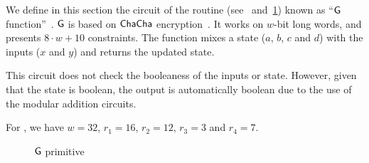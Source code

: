 We define in this section the circuit of the  routine (see~\cite[Section 3.1]{blakecompietf} and~\cref{implementation:alg:g}) known as ``$\mathsf{G}$ function''~\cite[Section 2.4]{aumasson2013blake2}. $\mathsf{G}$ is based on $\mathsf{ChaCha}$ encryption~\cite{bernstein2008chacha}. It works on $w$-bit long words, and presents $8 \cdot w+10$ constraints. The function mixes a state ($a$, $b$, $c$ and $d$) with the inputs ($x$ and $y$) and returns the updated state.

This circuit does not check the booleaness of the inputs or state. However, given that the state is boolean, the output is automatically boolean due to the use of the modular addition circuits.

For , we have $w=32$, $r_1=16$, $r_2 = 12$, $r_3=3$ and $r_4=7$.

\begin{figure*}
  \begin{minipage}[t]{.4\textwidth}
    \centering
    \caption{$\mathsf{G}$ primitive~\cite[Section 3.1]{blakecompietf}}\label{implementation:alg:g}
  \end{minipage}%
  \begin{minipage}[t]{.6\textwidth}
    \centering
\end{minipage}
\end{figure*}
